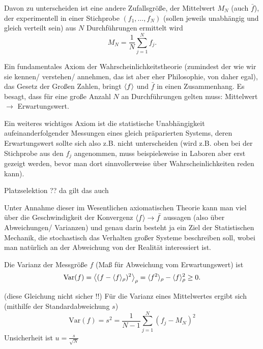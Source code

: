 \documentclass[../KlassMech_main.tex]{subfiles}
\begin{document}
Davon zu unterscheiden ist eine andere Zufallsgröße, der Mittelwert $M_N$ (auch $\bar{f}$), der experimentell in einer Stichprobe $(f_1, \dots, f_N)$ (sollen jeweils  unabhängig und gleich verteilt sein) aus $N$ Durchführungen ermittelt wird
\begin{equation}\label{key}
M_N = \frac{1}{N} \sum\limits_{j=1}^N f_j .
\end{equation}

Ein fundamentales Axiom der Wahrscheinlichkeitstheorie (zumindest der wie wir sie kennen/ verstehen/ annehmen, das ist aber eher Philosophie, von daher egal), das Gesetz der Großen Zahlen, bringt $\expval{f}$ und $\bar{f}$ in einen Zusammenhang. Es besagt, dass für eine große Anzahl $N$ an Durchführungen gelten muss: Mittelwert $\rightarrow$ Erwartungswert.

Ein weiteres wichtiges Axiom ist die statistische Unabhängigkeit aufeinanderfolgender Messungen eines gleich präparierten Systems, deren Erwartungswert sollte sich also z.B. nicht unterscheiden (wird z.B. oben bei der Stichprobe aus den $f_j$ angenommen, muss beispielsweise in Laboren aber erst gezeigt werden, bevor man dort sinnvollerweise über Wahrscheinlichkeiten reden kann).

Platzselektion ?? da gilt das auch

Unter Annahme dieser im Wesentlichen axiomatischen Theorie kann man viel über die Geschwindigkeit der Konvergenz $\expval{f} \rightarrow \bar{f}$ aussagen (also über Abweichungen/ Varianzen) und genau darin besteht ja ein Ziel der Statistischen Mechanik, die stochastisch das Verhalten großer Systeme beschreiben soll, wobei man natürlich an der Abweichung von der Realität interessiert ist.

Die Varianz der Messgröße $f$ (Maß für Abweichung vom Erwartungswert) ist
\begin{equation}\label{key}
\text{Var}(f) = \expval{ (f - \langle f \rangle_\rho)^2 }_\rho = \langle f^2 \rangle_\rho - \langle f \rangle^2_\rho \geq 0 .
\end{equation}


(diese Gleichung nicht sicher !!) Für die Varianz eines Mittelwertes ergibt sich (mithilfe der Standardabweichung $s$)
\begin{equation}\label{key}
\text{Var}(f) = s^2 = \frac{1}{N-1} \sum\limits_{j=1}^N (f_j - M_N)^2
\end{equation}
Unsicherheit ist $u=\frac{s}{\sqrt{N}}$
\end{document}

